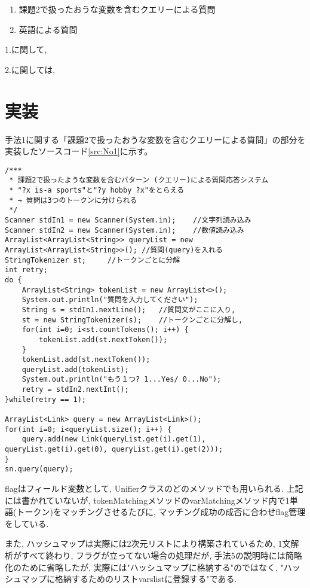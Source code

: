 \documentclass[uplatex,12pt]{jsarticle}
\begin{document}
\begin{enumerate}
\item 課題2で扱ったおうな変数を含むクエリーによる質問
\item 英語による質問
\end{enumerate}


1.に関して, 

2.に関しては,


\section{実装}

手法1に関する「課題2で扱ったおうな変数を含むクエリーによる質問」の部分を実装したソースコード\ref{src:No1}に示す。
\begin{lstlisting}[caption=1文すべて終わったら格納する,label=src:No1]
/***
 * 課題2で扱ったような変数を含むパターン (クエリー)による質問応答システム
 * "?x is-a sports"と"?y hobby ?x"をとらえる
 * → 質問は3つのトークンに分けられる
 */
Scanner stdIn1 = new Scanner(System.in);	//文字列読み込み
Scanner stdIn2 = new Scanner(System.in);	//数値読み込み
ArrayList<ArrayList<String>> queryList = new ArrayList<ArrayList<String>>(); //質問(query)を入れる
StringTokenizer st;		//トークンごとに分解
int retry;
do {
	ArrayList<String> tokenList = new ArrayList<>();
	System.out.println("質問を入力してください");
	String s = stdIn1.nextLine(); 	//質問文がここに入り,
	st = new StringTokenizer(s);	//トークンごとに分解し,
	for(int i=0; i<st.countTokens(); i++) {
		tokenList.add(st.nextToken());
	}
	tokenList.add(st.nextToken());
	queryList.add(tokenList);
	System.out.println("もう１つ? 1...Yes/ 0...No");
	retry = stdIn2.nextInt();
}while(retry == 1);

ArrayList<Link> query = new ArrayList<Link>();
for(int i=0; i<queryList.size(); i++) {
	query.add(new Link(queryList.get(i).get(1), queryList.get(i).get(0), queryList.get(i).get(2)));
}
sn.query(query);
\end{lstlisting}

flagはフィールド変数として, Unifierクラスのどのメソッドでも用いられる. 上記には書かれていないが, tokenMatchingメソッドのvarMatchingメソッド内で1単語(トークン)をマッチングさせるたびに, マッチング成功の成否に合わせflag管理をしている.

また, ハッシュマップは実際には2次元リストにより構築されているため, 1文解析がすべて終わり, フラグが立ってない場合の処理だが, 手法5の説明時には簡略化のために省略したが, 実際には"ハッシュマップに格納する"のではなく, "ハッシュマップに格納するためのリストvarslistに登録する"である.\\\\
\end{document}
